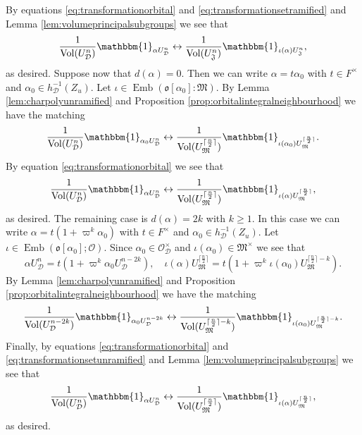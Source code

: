\documentclass{article}
\theoremstyle{named}
\newcommand{\D}{\mathcal{D}}
\newcommand{\M}{\mathfrak{M}}
\newcommand{\J}{\mathfrak{J}}
\renewcommand{\O}{\mathcal{O}}
\renewcommand{\o}{\mathfrak{o}}
\DeclareMathOperator{\vol}{Vol}
\DeclareMathOperator{\Emb}{Emb}
\begin{document}
By equations \eqref{eq:transformationorbital} and \eqref{eq:transformationsetramified} and Lemma \ref{lem:volumeprincipalsubgroups} we see that 
\begin{equation*}
    \frac{1}{\vol(U_\D^{n})}\mathbbm{1}_{\alpha U_\D^n} \leftrightarrow \frac{1}{\vol(U_\J^{n})}\mathbbm{1}_{\iota(\alpha) U_\J^n},
\end{equation*}
as desired. Suppose now that $d(\alpha) = 0$. Then we can write $\alpha = t \alpha_0$ with $t \in F^\times$ and $\alpha_0 \in h_\D^{-1}(Z_u)$. Let $\iota \in \Emb(\o[\alpha_0]: \M)$. By Lemma \ref{lem:charpolyunramified} and Proposition \ref{prop:orbitalintegralneighbourhood} we have the matching
\begin{equation*}
\frac{1}{\vol(U_\D^n)}\mathbbm{1}_{\alpha_0 U_\D^n} \leftrightarrow \frac{1}{\vol(U_\M^{\lceil \frac{n}{2}\rceil})}\mathbbm{1}_{\iota(\alpha_0) U_\M^{\lceil \frac{n}{2}\rceil}}.
\end{equation*}
By equation \eqref{eq:transformationorbital} we see that 
\begin{equation*}
\frac{1}{\vol(U_\D^n)}\mathbbm{1}_{\alpha U_\D^n} \leftrightarrow \frac{1}{\vol(U_\M^{\lceil \frac{n}{2}\rceil})}\mathbbm{1}_{\iota(\alpha) U_\M^{\lceil \frac{n}{2}\rceil}},
\end{equation*}
as desired. The remaining case is $d(\alpha) = 2k$ with $k \geq 1$. In this case we can write $\alpha = t(1 + \varpi^k \alpha_0)$ with $t \in F^\times$ and $\alpha_0 \in h_\D^{-1}(Z_u)$. Let $\iota \in \Emb(\o[\alpha_0]; \O)$. Since $\alpha_0 \in \O_\D^\times$ and $\iota(\alpha_0) \in \M^\times$ we see that 
\begin{equation}\label{eq:transformationsetunramified}
    \alpha U_\D^n = t(1 + \varpi^k \alpha_0 U_\D^{n-2k}), \quad \iota(\alpha)U_\M^{\lceil \frac{n}{2}\rceil} = t(1 + \varpi^k \iota(\alpha_0)U_\M^{\lceil \frac{n}{2}\rceil - k}).
\end{equation}
By Lemma \ref{lem:charpolyunramified} and Proposition \ref{prop:orbitalintegralneighbourhood} we have the matching 
\begin{equation*}
    \frac{1}{\vol(U_\D^{n-2k})}\mathbbm{1}_{\alpha_0 U_\D^{n - 2k}} \leftrightarrow \frac{1}{\vol(U_\M^{\lceil \frac{n}{2}\rceil - k})}\mathbbm{1}_{\iota(\alpha_0) U_\M^{\lceil \frac{n}{2}\rceil - k}}.
\end{equation*} 
Finally, by equations \eqref{eq:transformationorbital} and \eqref{eq:transformationsetunramified} and Lemma \ref{lem:volumeprincipalsubgroups} we see that
\begin{equation*}
    \frac{1}{\vol(U_\D^{n})}\mathbbm{1}_{\alpha U_\D^{n}} \leftrightarrow \frac{1}{\vol(U_\M^{\lceil \frac{n}{2}\rceil})}\mathbbm{1}_{\iota(\alpha) U_\M^{\lceil \frac{n}{2}\rceil}},
\end{equation*} 
as desired.
\end{document}
